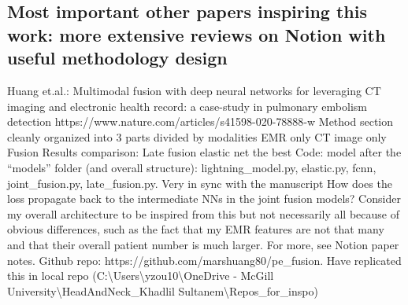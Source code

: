 \documentclass{article}%
\begin{document}
\subsection{Most important other papers inspiring this work: more extensive reviews on Notion with useful methodology design }%
\label{subsec:MostimportantotherpapersinspiringthisworkmoreextensivereviewsonNotionwithusefulmethodologydesign}%

%
Huang et.al.: Multimodal fusion with deep neural networks for leveraging CT imaging and electronic health record: a case{-}study in pulmonary embolism detection	%
\newline%
\newline%
%
https://www.nature.com/articles/s41598{-}020{-}78888{-}w%
\newline%
\newline%
%
Method section cleanly organized into 3 parts divided by modalities %
\newline%
\newline%
%
EMR only %
\newline%
\newline%
%
CT image only %
\newline%
\newline%
%
Fusion %
\newline%
\newline%
%
Results comparison: Late fusion elastic net the best %
\newline%
\newline%
%
Code: model after the “models” folder (and overall structure): lightning\_model.py, elastic.py, fcnn, joint\_fusion.py, late\_fusion.py. Very in sync with the manuscript %
\newline%
\newline%
%
How does the loss propagate back to the intermediate NNs in the joint fusion models? %
\newline%
\newline%
%
Consider my overall architecture to be inspired from this but not necessarily all because of obvious differences, such as the fact that my EMR features are not that many and that their overall patient number is much larger. %
\newline%
\newline%
%
For more, see Notion paper notes. %
\newline%
\newline%
%
Github repo: https://github.com/marshuang80/pe\_fusion. Have replicated this in local repo (C:\textbackslash{}Users\textbackslash{}yzou10\textbackslash{}OneDrive {-} McGill University\textbackslash{}HeadAndNeck\_Khadlil Sultanem\textbackslash{}Repos\_for\_inspo)   %
\end{document}
